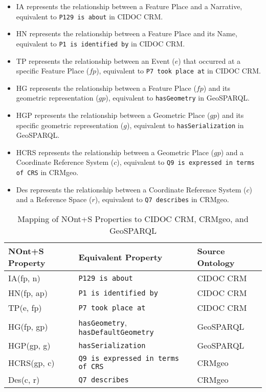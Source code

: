 \begin{itemize}
    \item \textsf{IA} represents the relationship between a Feature Place and a Narrative, equivalent to \texttt{P129 is about} in CIDOC CRM.
    
    \item \textsf{HN} represents the relationship between a Feature Place and its Name, equivalent to \texttt{P1 is identified by} in CIDOC CRM.
    
    \item \textsf{TP} represents the relationship between an Event (\(e\)) that occurred at a specific Feature Place (\(fp\)), equivalent to \texttt{P7 took place at} in CIDOC CRM.
    
    \item \textsf{HG} represents the relationship between a Feature Place (\(fp\)) and its geometric representation (\(gp\)), equivalent to \texttt{hasGeometry} in GeoSPARQL.
    
    \item \textsf{HGP} represents the relationship between a Geometric Place (\(gp\)) and its specific geometric representation (\(g\)), equivalent to \texttt{hasSerialization} in GeoSPARQL.
    
    \item \textsf{HCRS} represents the relationship between a Geometric Place (\(gp\)) and a Coordinate Reference System (\(c\)), equivalent to \texttt{Q9 is expressed in terms of CRS} in CRMgeo.
    
    \item \textsf{Des} represents the relationship between a Coordinate Reference System (\(c\)) and a Reference Space (\(r\)), equivalent to \texttt{Q7 describes} in CRMgeo.
\end{itemize}

\begin{table}[h!]
\centering
\caption{Mapping of NOnt+S Properties to CIDOC CRM, CRMgeo, and GeoSPARQL}
\label{tab:property_mapping_expanded}
\begin{tabular}{|l|l|l|}
\hline
\textbf{NOnt+S Property} & \textbf{Equivalent Property} & \textbf{Source Ontology} \\ \hline
\textsf{IA}(fp, n) & \texttt{P129 is about} & CIDOC CRM \\ \hline
\textsf{HN}(fp, ap) & \texttt{P1 is identified by} & CIDOC CRM \\ \hline
\textsf{TP}(e, fp) & \texttt{P7 took place at} & CIDOC CRM \\ \hline
\textsf{HG}(fp, gp) & \texttt{hasGeometry}, \texttt{hasDefaultGeometry} & GeoSPARQL \\ \hline
\textsf{HGP}(gp, g) & \texttt{hasSerialization} & GeoSPARQL \\ \hline
\textsf{HCRS}(gp, c) & \texttt{Q9 is expressed in terms of CRS} & CRMgeo \\ \hline
\textsf{Des}(c, r) & \texttt{Q7 describes} & CRMgeo \\ \hline
\end{tabular}
\end{table}



